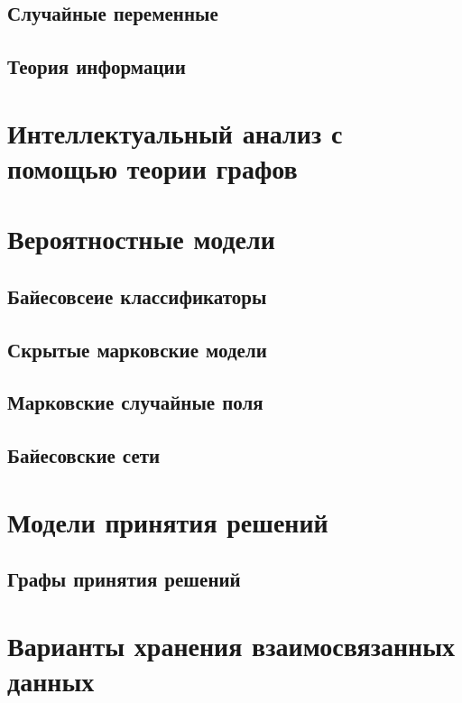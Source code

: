 \subsection{Случайные переменные}

\subsection{Теория информации}


\section{Интеллектуальный анализ с помощью теории графов}



\section{Вероятностные модели}

\subsection{Байесовсеие классификаторы}

\subsection{Скрытые марковские модели}

\subsection{Марковские случайные поля}

\subsection{Байесовские сети}


\section{Модели принятия решений}

\subsection{Графы принятия решений}


\section{Варианты хранения взаимосвязанных данных}


